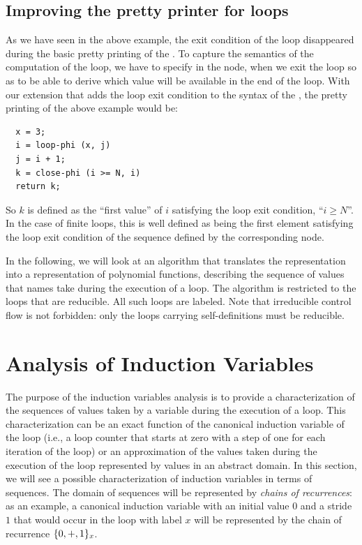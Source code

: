 \subsection{Improving the \SSA{} pretty printer for loops}

As we have seen in the above example, the exit condition of the loop
disappeared during the basic pretty printing of the \SSA{}.  To capture
the semantics of the computation of the loop, we have to specify in
the \closephi{} node, when we exit the loop so as to be able to derive which value will be available in the end of the
loop. With our
extension that adds the loop exit condition to the syntax of the \closephi{}, the \SSA{} pretty printing of the above example would be:
\begin{verbatim}
  x = 3;
  i = loop-phi (x, j)
  j = i + 1;
  k = close-phi (i >= N, i)
  return k;
\end{verbatim}
So $k$ is defined as the ``first value'' of $i$ satisfying the loop
exit condition, ``$i \geq N$''.  In the case of finite loops, this is well defined as being the first element satisfying the loop exit condition of the sequence defined by the corresponding \loopphi{} node.

In the following, we will look at an algorithm that translates the
\SSA{} representation into a representation of polynomial functions,
describing the sequence of values that \SSA{} names take during the
execution of a loop. The algorithm is restricted to the loops that are
reducible. All such loops are labeled. Note that irreducible control flow is not forbidden: only the loops carrying self-definitions must
be reducible.

\section{Analysis of Induction Variables}

The purpose of the induction variables analysis is to provide a
characterization of the sequences of values taken by a variable during
the execution of a loop.  This characterization can be an exact
function of the canonical induction variable of the loop (i.e., a loop counter that starts at zero with a step of one for
each iteration of the loop) or an approximation of the values taken
during the execution of the loop represented by values in an abstract
domain.  In this section, we will see a possible characterization of
induction variables in terms of sequences.  The domain of sequences
will be represented by {\em chains of recurrences}: as an example, a
canonical induction variable with an initial value $0$ and a stride
$1$ that would occur in the loop with label $x$ will be represented by
the chain of recurrence $\{0, +, 1\}_x$.

